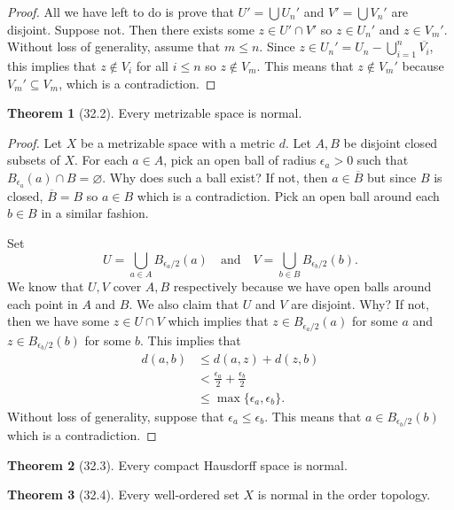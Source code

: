 \documentclass{article}
\newcommand{\nline}{\vspace*{0.5\baselineskip}}
\theoremstyle{definition}
\newtheorem{theorem}{Theorem}[subsection]
\begin{document}
\begin{flushleft}
\begin{proof}
All we have left to do is prove that $U' = \bigcup U_n'$ and $V' = \bigcup V_n'$ are disjoint. Suppose not. Then there exists some $z \in U' \cap V'$ so $z \in U_n'$ and $z \in V_m'$. Without loss of generality, assume that $m \leq n$. Since $z \in U_n' = U_n - \bigcup_{i=1}^n \overline{V_i}$, this implies that $z \notin V_i$ for all $i \leq n$ so $z \notin V_m$. This means that $z \notin V_m'$ because $V_m' \subseteq V_m$, which is a contradiction.
\end{proof}

\begin{theorem}[32.2]
Every metrizable space is normal.
\end{theorem}

\begin{proof}
Let $X$ be a metrizable space with a metric $d$. Let $A, B$ be disjoint closed subsets of $X$. For each $a \in A$, pick an open ball of radius $\epsilon_a > 0$ such that $B_{\epsilon_a}(a) \cap B = \varnothing$. Why does such a ball exist? If not, then $a \in \overline{B}$ but since $B$ is closed, $\overline{B} = B$ so $a \in B$ which is a contradiction. Pick an open ball around each $b \in B$ in a similar fashion.

\nline

Set
\[
U = \bigcup_{a \in A} B_{\epsilon_a/2}(a) \quad \text{and} \quad V = \bigcup_{b \in B} B_{\epsilon_b/2}(b).
\]
We know that $U, V$ cover $A, B$ respectively because we have open balls around each point in $A$ and $B$. We also claim that $U$ and $V$ are disjoint. Why? If not, then we have some $z \in U \cap V$ which implies that $z \in B_{\epsilon_a/2}(a)$ for some $a$ and $z \in B_{\epsilon_b/2}(b)$ for some $b$. This implies that
\[
\begin{align}
    d(a, b) &\leq d(a, z) + d(z, b) \\
    &< \frac{\epsilon_a}{2} + \frac{\epsilon_b}{2} \\
    &\leq \max \{\epsilon_a, \epsilon_b\}.
\end{align}
\]
Without loss of generality, suppose that $\epsilon_a \leq \epsilon_b$. This means that $a \in B_{\epsilon_b/2}(b)$ which is a contradiction.
\end{proof}

\begin{theorem}[32.3]
Every compact Hausdorff space is normal.
\end{theorem}

\begin{theorem}[32.4]
Every well-ordered set $X$ is normal in the order topology.
\end{theorem}


\end{flushleft}
\end{document}
